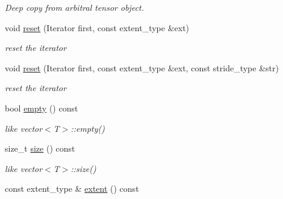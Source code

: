 \begin{DoxyCompactItemize}
\begin{DoxyCompactList}\small\item\em Deep copy from arbitral tensor object. \item\end{DoxyCompactList}\item 
\hypertarget{classbtas_1_1_tensor_view_aca12bdbba77219f365a721b4ee8900c2}{
void \hyperlink{classbtas_1_1_tensor_view_aca12bdbba77219f365a721b4ee8900c2}{reset} (Iterator first, const extent\_\-type \&ext)}
\label{classbtas_1_1_tensor_view_aca12bdbba77219f365a721b4ee8900c2}

\begin{DoxyCompactList}\small\item\em reset the iterator \item\end{DoxyCompactList}\item 
\hypertarget{classbtas_1_1_tensor_view_a54baab494abedd1c36a34c099df3c96a}{
void \hyperlink{classbtas_1_1_tensor_view_a54baab494abedd1c36a34c099df3c96a}{reset} (Iterator first, const extent\_\-type \&ext, const stride\_\-type \&str)}
\label{classbtas_1_1_tensor_view_a54baab494abedd1c36a34c099df3c96a}

\begin{DoxyCompactList}\small\item\em reset the iterator \item\end{DoxyCompactList}\item 
\hypertarget{classbtas_1_1_tensor_view_a51b19e9766bf1e651ea97ba458725d71}{
bool \hyperlink{classbtas_1_1_tensor_view_a51b19e9766bf1e651ea97ba458725d71}{empty} () const }
\label{classbtas_1_1_tensor_view_a51b19e9766bf1e651ea97ba458725d71}

\begin{DoxyCompactList}\small\item\em like vector$<$T$>$::empty() \item\end{DoxyCompactList}\item 
\hypertarget{classbtas_1_1_tensor_view_a6559ccdbf1dc8fa88fed006d5d12be1a}{
size\_\-t \hyperlink{classbtas_1_1_tensor_view_a6559ccdbf1dc8fa88fed006d5d12be1a}{size} () const }
\label{classbtas_1_1_tensor_view_a6559ccdbf1dc8fa88fed006d5d12be1a}

\begin{DoxyCompactList}\small\item\em like vector$<$T$>$::size() \item\end{DoxyCompactList}\item 
\hypertarget{classbtas_1_1_tensor_view_a0998790505462172a87fafaf4be499d0}{
const extent\_\-type \& \hyperlink{classbtas_1_1_tensor_view_a0998790505462172a87fafaf4be499d0}{extent} () const }
\label{classbtas_1_1_tensor_view_a0998790505462172a87fafaf4be499d0}


\end{DoxyCompactItemize}
